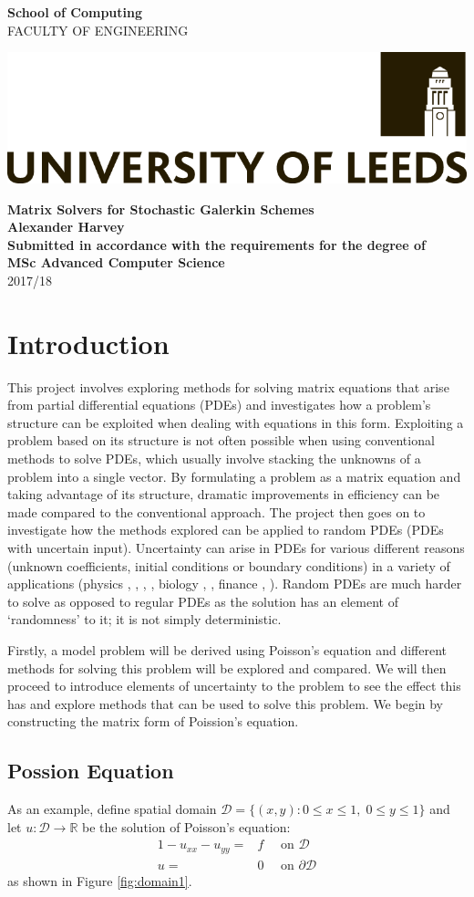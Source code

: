 \documentclass[11pt]{article}
\numberwithin{equation}{section}
\newcommand{\projectTitle}{Matrix Solvers for Stochastic Galerkin Schemes}
\newcommand{\fullname}{Alexander Harvey}
\newcommand{\degreeTitle}{MSc Advanced Computer Science}
\newcommand{\session}{2017/18}
\newcommand{\frontcover}{
\begin{titlepage}
\newgeometry{left=25mm,right=25mm,top=45mm,bottom=0.1cm}

\begin{minipage}[t]{7cm}
\noindent\textbf{\Large{School of Computing}}\\
{\fontfamily{ptm}\selectfont 
\uppercase{faculty of engineering}
}
\end{minipage}
\hfill
\begin{minipage}[t]{7cm}
\vspace*{-25pt}
\includegraphics[scale=0.2,right]{logo_black.png}
\vspace*{-1pt}
\end{minipage}

\noindent\makebox[\linewidth]{\rule{\paperwidth}{0.4pt}}

\centering
\vspace*{37mm}
\textbf{\Large\projectTitle}\\
\vspace*{10mm}
\textbf{\large\fullname}\\
\vspace*{10mm}
\textbf{Submitted in accordance with the requirements for the degree of}\\
\textbf{\degreeTitle}\\
\vspace*{10mm}
\session\\
\restoregeometry
\end{titlepage}
}
\begin{document}
\frontcover

\newpage


\tableofcontents

\clearpage


\section{Introduction}
This project involves exploring methods for solving matrix equations that arise from partial differential equations (PDEs) and investigates how a problem's structure can be exploited when dealing with equations in this form. Exploiting a problem based on its structure is not often possible when using conventional methods to solve PDEs, which usually involve stacking the unknowns of a problem into a single vector. By formulating a problem as a matrix equation and taking advantage of its structure, dramatic improvements in efficiency can be made compared to the conventional approach. The project then goes on to investigate how the methods explored can be applied to random PDEs (PDEs with uncertain input). Uncertainty can arise in PDEs for various different reasons (unknown coefficients, initial conditions or boundary conditions) in a variety of applications (physics \cite{Swanson}, \cite{Pryhara}, \cite{Breit}, \cite{Holm}, biology \cite{Bressloff}, \cite{Edwards}, finance \cite{Shreve03}, \cite{Shreve04}). Random PDEs are much harder to solve as opposed to regular PDEs as the solution has an element of `randomness' to it; it is not simply deterministic. 

Firstly, a model problem will be derived using Poisson's equation and different methods for solving this problem will be explored and compared. We will then proceed to introduce elements of uncertainty to the problem to see the effect this has and explore methods that can be used to solve this problem. We begin by constructing the matrix form of Poission's equation.

\subsection{Possion Equation}
As an example, define spatial domain $\mathcal{D} = \{(x,y) : 0 \leq x \leq 1, \; 0 \leq y \leq 1 \}$ and let $u: \mathcal{D} \to \mathbb{R}$ be the solution of Poisson's equation:
	\begin{alignat}{1} 
	-u_{xx} - u_{yy} = {} & f \quad \text{ on } \mathcal{D} \nonumber \\
	u = {} & 0 \quad \text{ on } \partial \mathcal{D}
	\end{alignat}
as shown in Figure \ref{fig:domain1}.
\end{document}
